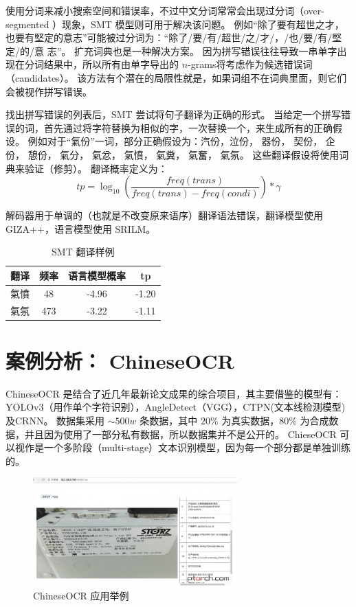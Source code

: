 使用分词来减小搜索空间和错误率，不过中文分词常常会出现过分词（over-segmented ）现象，SMT 模型则可用于解决该问题。
例如“除了要有超世之才，也要有堅定的意志”可能被过分词为：“除了/要/有/超世/之/才/，/也/要/有/堅定/的/意
志”。
扩充词典也是一种解决方案。
因为拼写错误往往导致一串单字出现在分词结果中，所以所有由单字导出的 $n$-grams将考虑作为候选错误词（candidates）。
该方法有个潜在的局限性就是，如果词组不在词典里面，则它们会被视作拼写错误。

找出拼写错误的列表后，SMT 尝试将句子翻译为正确的形式。
当给定一个拼写错误的词，首先通过将字符替换为相似的字，一次替换一个，来生成所有的正确假设。
例如对于“氣份”一词，部分正确假设为：汽份，泣份，
器份， 契份，
企份， 憩份，
氣分， 氣忿，
氣憤， 氣糞，
氣奮， 氣氛。
这些翻译假设将使用词典来验证（修剪）。
翻译概率定义为：
\begin{equation}
tp = \log_{10} \left(\frac{freq(trans)}{freq(trans) - freq(condi)}\right)*\gamma
\end{equation}

解码器用于单调的（也就是不改变原来语序）翻译语法错误，翻译模型使用GIZA++，语言模型使用 SRILM。

\begin{table}[!hpt]
	\caption[]{SMT 翻译样例}
	\label{tab:preprocessing_papers}
	\centering
	\begin{tabular}{|c|c|c|c|}
		\hline
		翻译 & 频率 & 语言模型概率 & tp \\ [0.5ex] 
		\hline
		氣憤 & 48 & -4.96 & -1.20 \\
		\hline
		氣氛 & 473 & -3.22 & -1.11 \\[1ex] 
		\hline
	\end{tabular}
\end{table}

\chapter{案例分析： ChineseOCR}
\label{chap:chineseocr}

ChineseOCR 是结合了近几年最新论文成果的综合项目，其主要借鉴的模型有：YOLOv3（用作单个字符识别），AngleDetect（VGG），CTPN(文本线检测模型)及CRNN。
数据集采用 $\sim 500w$ 条数据，其中 $20\%$ 为真实数据，$80\%$ 为合成数据，并且因为使用了一部分私有数据，所以数据集并不是公开的。
ChieseOCR 可以视作是一个多阶段（multi-stage）文本识别模型，因为每一个部分都是单独训练的。

\begin{figure}[h!]
	\centering
	\includegraphics[width=0.7\textwidth]{figure/resources/chineseocr_ex1.jpg}
	\caption{ChineseOCR 应用举例\label{chineseocr_ex1}}
\end{figure}


